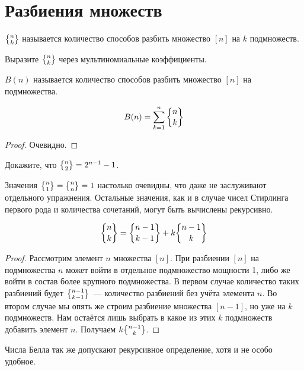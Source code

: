 \section{Разбиения множеств}

\begin{definition}
 $\sstirling{n}{k}$ называется количество способов разбить множество $[n]$ на $k$ подмножеств.
\end{definition}

\begin{exercise}
Выразите $\sstirling{n}{k}$ через мультиномиальные коэффициенты.
\end{exercise}

\begin{definition}
 $B(n)$ называется количество способов разбить множество $[n]$ на подмножества.
\end{definition}

\begin{thm}
$$B(n) = \sum_{k=1}^n\sstirling{n}{k}$$
\end{thm}
\begin{proof}
Очевидно.
\end{proof}

\begin{exercise}
Докажите, что $\sstirling{n}{2} = 2^{n-1} - 1$.
\end{exercise}

Значения $\sstirling{n}{1} = \sstirling{n}{n} = 1$ настолько очевидны, что даже не заслуживают отдельного упражнения. Остальные значения, как и в случае чисел Стирлинга первого рода и количества сочетаний, могут быть вычислены рекурсивно.

\begin{thm}
$$\sstirling{n}{k} = \sstirling{n-1}{k-1} + k\sstirling{n-1}{k}$$
\end{thm}
\begin{proof}
Рассмотрим элемент $n$ множества $[n]$. При разбиении $[n]$ на подмножества $n$ может войти в отдельное подмножество мощности 1, либо же войти в состав более крупного подмножества. В первом случае количество таких разбиений будет $\sstirling{n-1}{k-1}$~--- количество разбиений без учёта элемента $n$. Во втором случае мы опять же строим разбиение множества $[n-1]$, но уже на $k$ подмножеств. Нам остаётся лишь выбрать в какое из этих $k$ подмножеств добавить элемент $n$. Получаем $k\sstirling{n-1}{k}$.
\end{proof}

Числа Белла так же допускают рекурсивное определение, хотя и не особо удобное.

